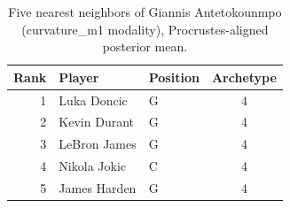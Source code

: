 \begin{table}[htbp]
  \centering\small
  \begin{tabular}{rllc}
    \toprule
    Rank & Player & Position & Archetype \\
    \midrule
    1 & Luka Doncic & G & 4 \\
    2 & Kevin Durant & G & 4 \\
    3 & LeBron James & G & 4 \\
    4 & Nikola Jokic & C & 4 \\
    5 & James Harden & G & 4 \\
    \bottomrule
  \end{tabular}
  \caption{Five nearest neighbors of Giannis Antetokounmpo (curvature_m1 modality), Procrustes-aligned posterior mean.}
  \label{tab:Giannis_Antetokounmpo_neighbors_curvature_m1}
\end{table}

